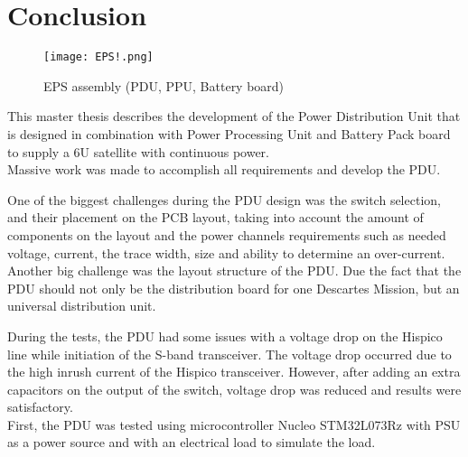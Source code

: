 \chapter{Conclusion\label{cha:chapter7}}

 \begin{figure}[h]
 	\centering
 	\texttt{[image: EPS!.png]}
 	\caption{EPS assembly (PDU, PPU, Battery board)}
 	\label{fig: EPS!}
 \end{figure}

This master thesis describes the development of the Power Distribution Unit that is designed in combination with Power Processing Unit and Battery Pack board to supply a 6U satellite with  continuous power.\\  


Massive work was made to accomplish all requirements and develop the PDU.
 

 One of the biggest challenges during the PDU design was the switch selection, and their placement on the PCB layout, taking into account the amount of components on the layout and the power channels requirements such as needed voltage, current, the trace width, size and ability to determine an over-current. Another big challenge was the layout structure of the PDU. Due the fact that the PDU should not only be the distribution board for one Descartes Mission, but an universal distribution unit. 
 
  During the tests, the PDU had some issues with a voltage drop on the Hispico line while initiation of the S-band transceiver. The voltage drop occurred due to the high inrush current of the Hispico transceiver. However, after adding an extra capacitors on the output of the switch, voltage drop was reduced and results were satisfactory.    \\ 

First, the PDU was tested using microcontroller Nucleo STM32L073Rz with PSU as a power source and with an electrical load to simulate the load. 

